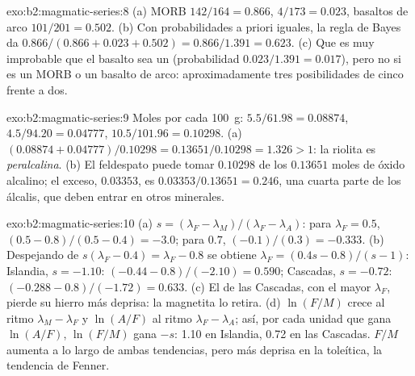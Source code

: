 \begin{solution}{exo:b2:magmatic-series:8}
(a) MORB $142/164 = 0.866$,  $4/173 = 0.023$, basaltos de arco $101/201 =
0.502$. (b) Con probabilidades a priori iguales, la regla de Bayes da $0.866/(0.866 + 0.023 + 0.502) =
0.866/1.391 = 0.623$. (c) Que es muy improbable que el basalto sea un 
(probabilidad $0.023/1.391 = 0.017$), pero no si es un MORB o un basalto de arco:
aproximadamente tres posibilidades de cinco frente a dos.
\end{solution}

\begin{solution}{exo:b2:magmatic-series:9}
Moles por cada \qty{100}{g}:  $5.5/61.98 = 0.08874$,  $4.5/94.20 =
0.04777$,  $10.5/101.96 = 0.10298$. (a) $(0.08874 + 0.04777)/0.10298 =
0.13651/0.10298 = 1.326 > 1$: la riolita es \emph{peralcalina}. (b) El feldespato puede
tomar $0.10298$ de los $0.13651$ moles de óxido alcalino; el exceso, $0.03353$, es
$0.03353/0.13651 = 0.246$, una cuarta parte de los álcalis, que deben entrar en otros minerales.
\end{solution}

\begin{solution}{exo:b2:magmatic-series:10}
(a) $s = (\lambda_F - \lambda_M)/(\lambda_F - \lambda_A)$: para $\lambda_F = 0.5$, $(0.5
- 0.8)/(0.5 - 0.4) = -3.0$; para $0.7$, $(-0.1)/(0.3) = -0.333$. (b) Despejando de
$s(\lambda_F - 0.4) = \lambda_F - 0.8$ se obtiene $\lambda_F = (0.4s - 0.8)/(s - 1)$:
Islandia, $s = -1.10$: $(-0.44 - 0.8)/(-2.10) = 0.590$; Cascadas, $s = -0.72$:
$(-0.288 - 0.8)/(-1.72) = 0.633$. (c) El  de las Cascadas, con el mayor
$\lambda_F$, pierde su hierro más deprisa: la magnetita lo retira. (d) $\ln(F/M)$ crece al
ritmo $\lambda_M - \lambda_F$ y $\ln(A/F)$ al ritmo $\lambda_F - \lambda_A$; así, por
cada unidad que gana $\ln(A/F)$, $\ln(F/M)$ gana $-s$: 1.10 en Islandia, 0.72 en las
Cascadas. $F/M$ aumenta a lo largo de ambas tendencias, pero más deprisa en la toleítica, la tendencia
de Fenner.
\end{solution}

